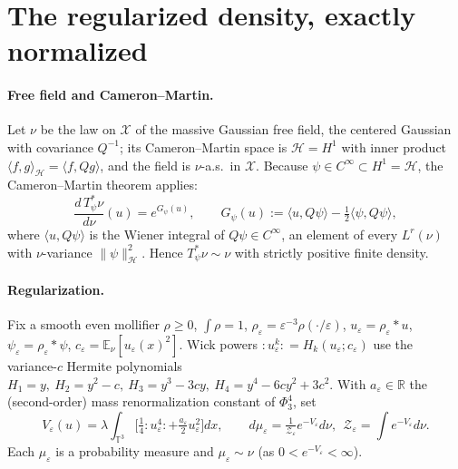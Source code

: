 \documentclass[12pt]{article}
\newcommand{\bR}{\mathbb{R}}
\newcommand{\bT}{\mathbb{T}}
\newcommand{\bE}{\mathbb{E}}
\newcommand{\Wick}[1]{{:}#1{:}}
\newcommand{\eps}{\varepsilon}
\theoremstyle{plain}
\theoremstyle{definition}
\begin{document}
\section{The regularized density, exactly normalized}\label{sec:reg}

\paragraph{Free field and Cameron--Martin.}
Let $\nu$ be the law on $\mathcal X$ of the massive Gaussian free field, the centered
Gaussian with covariance $Q^{-1}$; its Cameron--Martin space is $\mathcal H=H^1$ with
inner product $\langle f,g\rangle_{\mathcal H}=\langle f,Qg\rangle$, and the field is
$\nu$-a.s.\ in $\mathcal X$. Because $\psi\in C^\infty\subset H^1=\mathcal H$, the
Cameron--Martin theorem applies:
\begin{equation}\label{eq:CM}
\frac{d\,T_\psi^\ast\nu}{d\nu}(u)=e^{G_\psi(u)},\qquad
G_\psi(u):=\langle u,Q\psi\rangle-\tfrac12\langle\psi,Q\psi\rangle,
\end{equation}
where $\langle u,Q\psi\rangle$ is the Wiener integral of $Q\psi\in C^\infty$, an element
of every $L^r(\nu)$ with $\nu$-variance $\|\psi\|_{\mathcal H}^2$. Hence
$T_\psi^\ast\nu\sim\nu$ with strictly positive finite density. 
\paragraph{Regularization.}
Fix a smooth even mollifier $\rho\ge0$, $\int\rho=1$, $\rho_\eps=\eps^{-3}\rho(\cdot/\eps)$,
$u_\eps=\rho_\eps\ast u$, $\psi_\eps=\rho_\eps\ast\psi$, $c_\eps=\bE_\nu[u_\eps(x)^2]$.
Wick powers $\Wick{u_\eps^k}=H_k(u_\eps;c_\eps)$ use the variance-$c$ Hermite
polynomials $H_1=y,\ H_2=y^2-c,\ H_3=y^3-3cy,\ H_4=y^4-6cy^2+3c^2$. With $a_\eps\in\bR$
the (second-order) mass renormalization constant of $\Phi^4_3$, set
\begin{equation}\label{eq:Veps}
V_\eps(u)=\lambda\!\int_{\bT^3}\!\Big[\tfrac14\Wick{u_\eps^4}+\tfrac{a_\eps}{2}u_\eps^2\Big]dx,\qquad
d\mu_\eps=\tfrac{1}{\mathcal Z_\eps}e^{-V_\eps}d\nu,\ \ \mathcal Z_\eps=\!\int e^{-V_\eps}d\nu.
\end{equation}
Each $\mu_\eps$ is a probability measure and $\mu_\eps\sim\nu$ (as $0<e^{-V_\eps}<\infty$).
\end{document}
